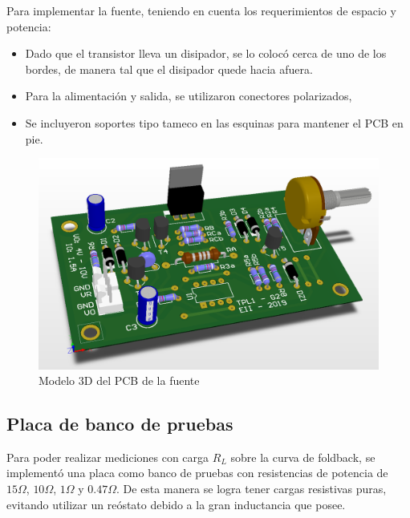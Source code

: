 Para implementar la fuente, teniendo en cuenta los requerimientos de espacio y potencia:

\begin{itemize}
\item Dado que el transistor lleva un disipador, se lo coloc\'o cerca de uno de los bordes, de manera tal que el disipador quede hacia afuera.
\item Para la alimentaci\'on y salida, se utilizaron conectores polarizados,
\item Se incluyeron soportes tipo tameco en las esquinas para mantener el PCB en pie.
\end{itemize}

\begin{figure}[!h]
\begin{centering}
\includegraphics[scale=0.45]{Imagenes/Fuente3D.png}
\par\end{centering}
\caption{Modelo 3D del PCB de la fuente}

\end{figure}

\subsection{Placa de banco de pruebas}

Para poder realizar mediciones con carga $R_L$ sobre la curva de foldback, se implement\'o una placa como banco de pruebas con resistencias de potencia de $15\Omega$, $10\Omega$, $1\Omega$ y $0.47\Omega$. De esta manera se logra tener cargas resistivas puras, evitando utilizar un re\'ostato debido a la gran inductancia que posee.

